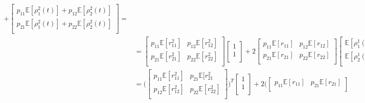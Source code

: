 \documentclass[\main/main.tex]{subfiles}
\begin{document}
\begin{equation}
\begin{split}
 +
 \begin{bmatrix} 
 p_{11}\mathds{E}[\rho_1^2(t)] + p_{12}\mathds{E}[\rho_2^2(t)] \\
 p_{21}\mathds{E}[\rho_1^2(t)] +  p_{22}\mathds{E}[\rho_2^2(t)]\\
 \end{bmatrix} =\\
  &= 
 \begin{bmatrix} 
 p_{11}\mathds{E}[r^2_{11}] & p_{12}\mathds{E}[r^2_{12}]\\
 p_{21}\mathds{E}[r^2_{21}] &  p_{22} \mathds{E}[r^2_{22}]\\
 \end{bmatrix}
  \begin{bmatrix}
 1\\
 1\\
 \end{bmatrix}
 + 2
 \begin{bmatrix}
 p_{11}\mathds{E}[r_{11}] & p_{12}\mathds{E}[r_{12}]\\
 p_{21}\mathds{E}[r_{21}] & p_{22}\mathds{E}[r_{22}]\\
 \end{bmatrix}
 \begin{bmatrix}
 \mathds{E}[\rho_1^1(t)]\\
 \mathds{E}[\rho_2^1(t)]\\
 \end{bmatrix}
 +
 \begin{bmatrix} 
 p_{11}& p_{12} \\
  p_{21}& p_{22} \\
 \end{bmatrix}
 \begin{bmatrix}
 \mathds{E}[\rho_2^1(t)]\\
 \mathds{E}[\rho_2^2(t)]
 \end{bmatrix}
 =
 \\
 &= \Bigg( \begin{bmatrix} 
 p_{11}\mathds{E}[r^2_{11}] & p_{21}\mathds{E}[r^2_{21}\\
 p_{12}\mathds{E}[r^2_{12}]&  p_{22} \mathds{E}[r^2_{22}]\\
 \end{bmatrix}
  \Bigg) ^T
  \begin{bmatrix}
 1\\
 1\\
 \end{bmatrix}
 + 2\Bigg( 
 \begin{bmatrix}
 p_{11}\mathds{E}[r_{11}] & p_{21}\mathds{E}[r_{21}]\\

\end{bmatrix}
\end{split}
\end{equation}
\end{document}
